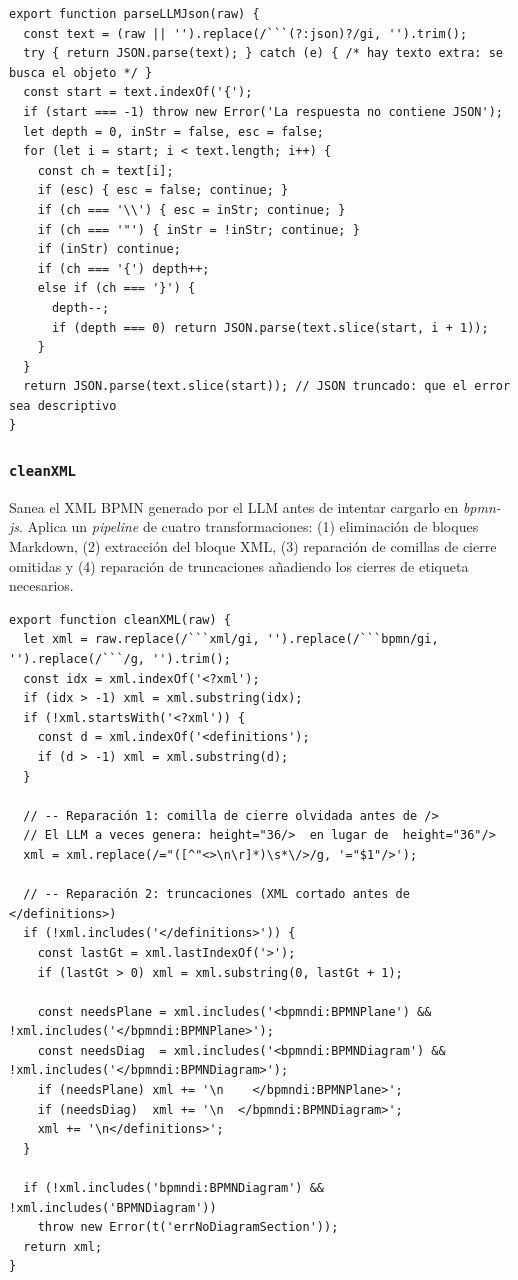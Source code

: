 \begin{lstlisting}[style=promptbox]
export function parseLLMJson(raw) {
  const text = (raw || '').replace(/```(?:json)?/gi, '').trim();
  try { return JSON.parse(text); } catch (e) { /* hay texto extra: se busca el objeto */ }
  const start = text.indexOf('{');
  if (start === -1) throw new Error('La respuesta no contiene JSON');
  let depth = 0, inStr = false, esc = false;
  for (let i = start; i < text.length; i++) {
    const ch = text[i];
    if (esc) { esc = false; continue; }
    if (ch === '\\') { esc = inStr; continue; }
    if (ch === '"') { inStr = !inStr; continue; }
    if (inStr) continue;
    if (ch === '{') depth++;
    else if (ch === '}') {
      depth--;
      if (depth === 0) return JSON.parse(text.slice(start, i + 1));
    }
  }
  return JSON.parse(text.slice(start)); // JSON truncado: que el error sea descriptivo
}
\end{lstlisting}

\subsubsection{\texttt{cleanXML}}

Sanea el XML BPMN generado por el LLM antes de intentar cargarlo en \textit{bpmn-js}. Aplica un \textit{pipeline} de cuatro transformaciones: (1) eliminación de bloques Markdown, (2) extracción del bloque XML, (3) reparación de comillas de cierre omitidas y (4) reparación de truncaciones añadiendo los cierres de etiqueta necesarios.

\begin{lstlisting}[style=promptbox]
export function cleanXML(raw) {
  let xml = raw.replace(/```xml/gi, '').replace(/```bpmn/gi, '').replace(/```/g, '').trim();
  const idx = xml.indexOf('<?xml');
  if (idx > -1) xml = xml.substring(idx);
  if (!xml.startsWith('<?xml')) {
    const d = xml.indexOf('<definitions');
    if (d > -1) xml = xml.substring(d);
  }

  // -- Reparación 1: comilla de cierre olvidada antes de />
  // El LLM a veces genera: height="36/>  en lugar de  height="36"/>
  xml = xml.replace(/="([^"<>\n\r]*)\s*\/>/g, '="$1"/>');

  // -- Reparación 2: truncaciones (XML cortado antes de </definitions>)
  if (!xml.includes('</definitions>')) {
    const lastGt = xml.lastIndexOf('>');
    if (lastGt > 0) xml = xml.substring(0, lastGt + 1);

    const needsPlane = xml.includes('<bpmndi:BPMNPlane') && !xml.includes('</bpmndi:BPMNPlane>');
    const needsDiag  = xml.includes('<bpmndi:BPMNDiagram') && !xml.includes('</bpmndi:BPMNDiagram>');
    if (needsPlane) xml += '\n    </bpmndi:BPMNPlane>';
    if (needsDiag)  xml += '\n  </bpmndi:BPMNDiagram>';
    xml += '\n</definitions>';
  }

  if (!xml.includes('bpmndi:BPMNDiagram') && !xml.includes('BPMNDiagram'))
    throw new Error(t('errNoDiagramSection'));
  return xml;
}
\end{lstlisting}


